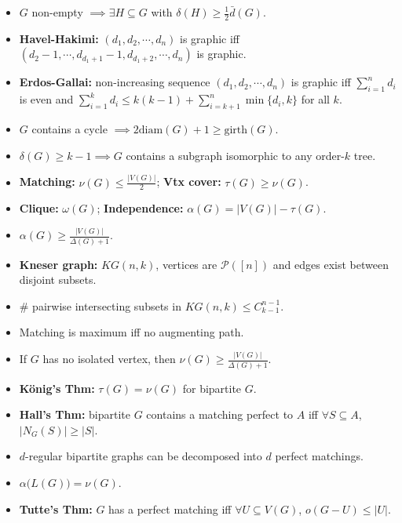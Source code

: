 \documentclass[10pt]{article}
\newcommand{\abs}[1]{\left\lvert#1\right\rvert}
\begin{document}
    \begin{multicols*}{3}
        \begin{itemize}
            \item $G$ non-empty $\implies \exists H \subseteq G$ with $\delta(H) \geq \frac{1}{2} \bar{d}(G)$.
            \item \textbf{Havel-Hakimi:} $(d_1, d_2, \cdots, d_n)$ is graphic iff $(d_2 - 1, \cdots, d_{d_1 + 1} - 1, d_{d_1 + 2}, \cdots, d_n)$ is graphic.
            \item \textbf{Erdos-Gallai:} non-increasing sequence $(d_1, d_2, \cdots, d_n)$ is graphic iff $\sum_{i = 1}^n d_i$ is even and $\sum_{i = 1}^{k} d_i \leq k(k - 1) + \sum_{i = k + 1}^{n}\min\{d_i, k\}$ for all $k$.
            \item $G$ contains a cycle $\implies 2\mathrm{diam}(G) + 1 \geq \mathrm{girth}(G)$.
            \item $\delta(G) \geq k - 1 \implies G$ contains a subgraph isomorphic to any order-$k$ tree.
            \item \textbf{Matching:} $\nu(G) \leq \frac{\abs{V(G)}}{2}$; \textbf{Vtx cover:} $\tau(G) \geq \nu(G)$.
            \item \textbf{Clique:} $\omega(G)$; \textbf{Independence:} $\alpha(G) = \abs{V(G)} - \tau(G)$.
            \item $\alpha(G) \geq \frac{\abs{V(G)}}{\Delta(G) + 1}$.
            \item \textbf{Kneser graph:} $KG(n, k)$, vertices are $\mathcal{P}([n])$ and edges exist between disjoint subsets.
            \item \# pairwise intersecting subsets in $KG(n, k) \leq C^{n - 1}_{k - 1}$.
            \item Matching is maximum iff no augmenting path.
            \item If $G$ has no isolated vertex, then $\nu(G) \geq \frac{\abs{V(G)}}{\Delta(G) + 1}$.
            \item \textbf{K\"{o}nig's Thm:} $\tau(G) = \nu(G)$ for bipartite $G$.
            \item \textbf{Hall's Thm:} bipartite $G$ contains a matching perfect to $A$ iff $\forall S \subseteq A$, $\abs{N_G(S)} \geq \abs{S}$.
            \item $d$-regular bipartite graphs can be decomposed into $d$ perfect matchings.
            \item $\alpha\bigl(L(G)\bigr) = \nu(G)$.        
            \item \textbf{Tutte's Thm:} $G$ has a perfect matching iff $\forall U \subseteq V(G)$, $o(G - U) \leq \abs{U}$. 

\end{itemize}
\end{multicols*}
\end{document}
